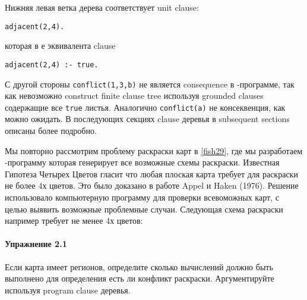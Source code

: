 \noindent{}

Нижняя левая ветка дерева соответствует unit clause:

\begin{verbatim}
adjacent(2,4). 
\end{verbatim}

которая в \prolog е эквивалента clause

\begin{verbatim}
adjacent(2,4) :- true. 
\end{verbatim}

С другой стороны \verb'conflict(1,3,b)' не является consequence в
\prolog-программе, так как невозможно construct finite clause tree используя
grounded clauses  содержащие все \verb'true' листья. Аналогично
\verb'conflict(a)' не консеквенция, как можно ожидать. В последующих секциях
clause деревья в subsequent sections описаны более подробно.

Мы повторно рассмотрим проблему раскраски карт в \ref{fish29}, где мы
разработаем \prolog-программу которая генерирует все возможные схемы
раскраски. Известная Гипотеза Четырех Цветов
гласит что любая плоская карта требует для раскраски не более 4х цветов. Это
было доказано в работе Appel и Haken (1976). Решение использовало компьютерную
программу для проверки всевоможных карт, с целью выявить
возможные проблемные случаи. Следующая схема раскраски например требует не менее
4х цветов:


\paragraph{Упражнение 2.1} Если карта имеет  регионов, определите сколько
вычислений должно быть выполнено для определения есть ли конфликт раскраски.
Аргументируйте используя program clause деревья.